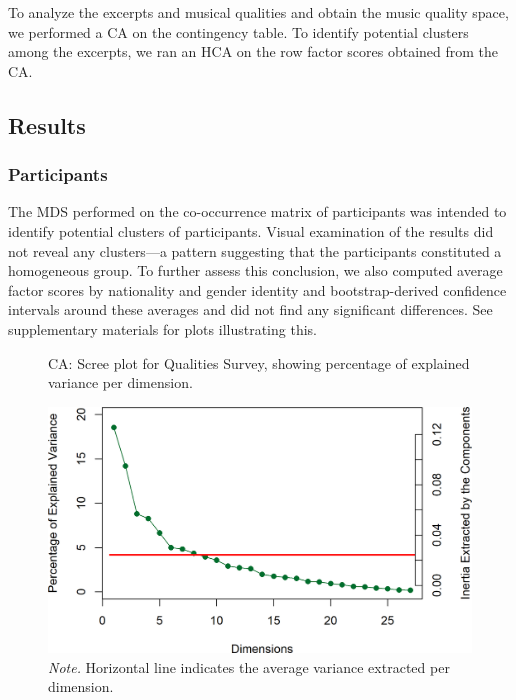 \documentclass[
  english,
  man,floatsintext]{apa6}
\begin{document}
To analyze the excerpts and musical qualities and obtain the music quality space, we performed a CA on the contingency table. To identify potential clusters among the excerpts, we ran an HCA on the row factor scores obtained from the CA.

\hypertarget{results}{%
\subsection{Results}\label{results}}

\hypertarget{participants-1}{%
\subsubsection{Participants}\label{participants-1}}

The MDS performed on the co-occurrence matrix of participants was intended to identify potential clusters of participants. Visual examination of the results did not reveal any clusters---a pattern suggesting that the participants constituted a homogeneous group. To further assess this conclusion, we also computed average factor scores by nationality and gender identity and bootstrap-derived confidence intervals around these averages and did not find any significant differences. See supplementary materials for plots illustrating this.

\begin{figure}  
  \begin{center}
  \caption{CA: Scree plot for Qualities Survey, showing percentage of explained variance per dimension.}
    \includegraphics{./Music-Descriptor-Space_files/figure-latex/scree4excerptsq-1.png}
  \caption*{\footnotesize \textit{Note.} Horizontal line indicates the average variance extracted per dimension. }\label{fig:scree4excerptsq}  
 \end{center}
\end{figure}
\end{document}
